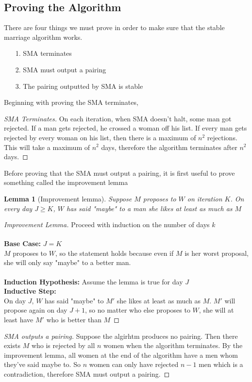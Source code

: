 \documentclass{article}
\newtheorem{proof}{Proof}
\newtheorem{lemma}{Lemma}
\begin{document}
\subsection{Proving the Algorithm}
There are four things we must prove in order to make sure that the stable marriage algorithm works.
\begin{itemize}
    \item[1. ] SMA terminates
    \item[2. ] SMA must output a pairing
    \item[3. ] The pairing outputted by SMA is stable
\end{itemize}
Beginning with proving the SMA terminates,
\begin{proof}[SMA Terminates]
    On each iteration, when SMA doesn't halt, some man got rejected. If a man gets 
    rejected, he crossed a woman off his list. If every man gets rejected by every woman on his list, then
    there is a maximum of $n^2$ rejections. This will take a maximum of $n^2$ days, therefore the algorithm
    terminates after $n^2$ days.
\end{proof}
Before proving that the SMA must output a pairing, it is first useful to prove something called the improvement lemma
\begin{lemma}[Improvement lemma]
    Suppose $M$ proposes to $W$ on iteration $K$. On every day $J \ge K$,
    $W$ has said "maybe" to a man she likes at least as much as $M$ 
\end{lemma}
\begin{proof}[Improvement Lemma]
    Proceed with induction on the number of days $k$\\\\
    \textbf{Base Case: }$J = K$\\
    $M$ proposes to $W$, so the statement holds because even if $M$ is her worst proposal,
    she will only say "maybe" to a better man.\\\\
    \textbf{Induction Hypothesis: } Assume the lemma is true for day $J$\\
    \textbf{Inductive Step: }\\
    On day $J$, $W$ has said "maybe" to $M'$ she likes at least as much as $M$. $M'$ will propose again on
    day $J+1$, so no matter who else proposes to $W$, she will at least have $M'$ who is better than $M$
\end{proof}
\begin{proof}[SMA outputs a pairing]
    Suppose the algirhtm produces no pairing. Then there exists $M$ who is rejected by all $n$ women
    when the algorithm terminates. By the improvement lemma, all women at the end of the algorithm have a men
    whom they've said maybe to. So $n$ women can only have rejected $n-1$ men which is a contradiction, therefore
    SMA must output a pairing.
\end{proof}
\end{document}
